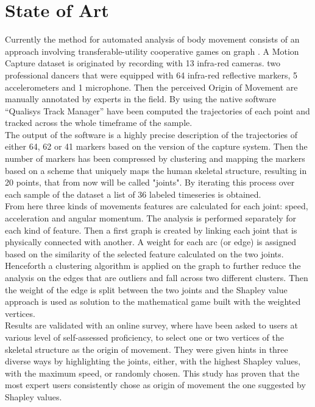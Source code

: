 \chapter{State of Art}
Currently the method for automated analysis of body movement consists of an approach involving transferable-utility cooperative games on graph \cite{kolykhalova:2020}.
A Motion Capture dataset is originated by recording with 13 infra-red cameras. two professional dancers that were equipped with 64 infra-red reflective markers, 5 accelerometers and 1 microphone.
Then the perceived Origin of Movement are manually annotated by experts in the field.
By using the native software “Qualisys Track Manager” have been computed the trajectories of each point and tracked across the whole timeframe of the sample.\\
The output of the software is a highly precise description of the trajectories of either 64, 62 or 41 markers based on the version of the capture system. 
Then the number of markers has been compressed by clustering and mapping the markers based on a scheme that uniquely maps the human skeletal structure, resulting in 20 points, that from now will be called "joints".
By iterating this process over each sample of the dataset a list of 36 labeled timeseries is obtained.\\
From here three kinds of movements features are calculated for each joint: speed, acceleration and angular momentum.
The analysis is performed separately for each kind of feature.
Then a first graph is created by linking each joint that is physically connected with another.
A weight for each arc (or edge) is assigned based on the similarity of the selected feature calculated on the two joints.
Henceforth a clustering algorithm is applied on the graph to further reduce the analysis on the edges that are outliers and fall across two different clusters.
Then the weight of the edge is split between the two joints and the Shapley value approach is used as solution to the mathematical game built with the weighted vertices.\\

Results are validated with an online survey, where have been asked to users at various level of self-assessed proficiency, 
to select one or two vertices of the skeletal structure as the origin of movement.
They were given hints in three diverse ways by highlighting the joints, either, 
with the highest Shapley values, with the maximum speed, or randomly chosen. 
This study has proven that the most expert users consistently chose as origin of movement the one suggested by Shapley values. 